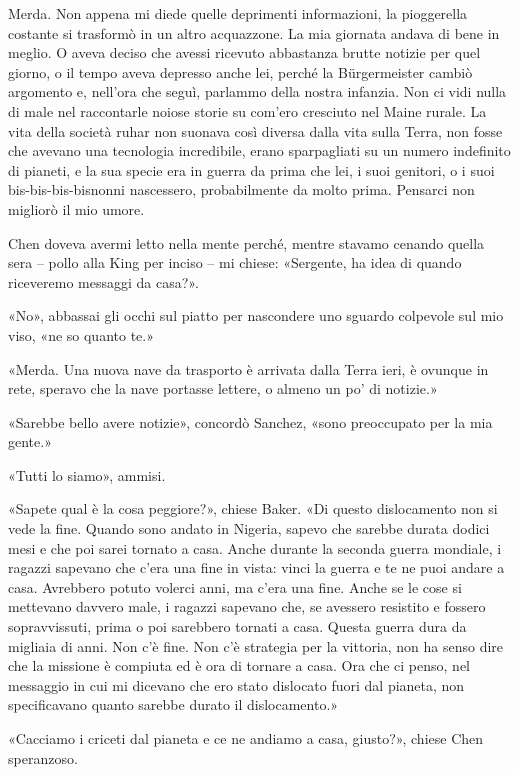 Merda. Non appena mi diede quelle deprimenti informazioni, la
pioggerella costante si trasformò in un altro acquazzone. La mia
giornata andava di bene in meglio. O aveva deciso che avessi ricevuto
abbastanza brutte notizie per quel giorno, o il tempo aveva depresso
anche lei, perché la Bürgermeister cambiò argomento e, nell'ora che
seguì, parlammo della nostra infanzia. Non ci vidi nulla di male nel
raccontarle noiose storie su com'ero cresciuto nel Maine rurale. La vita
della società ruhar non suonava così diversa dalla vita sulla Terra, non
fosse che avevano una tecnologia incredibile, erano sparpagliati su un
numero indefinito di pianeti, e la sua specie era in guerra da prima che
lei, i suoi genitori, o i suoi bis-bis-bis-bisnonni nascessero,
probabilmente da molto prima. Pensarci non migliorò il mio umore.

\hfill\break

Chen doveva avermi letto nella mente perché, mentre stavamo cenando
quella sera -- pollo alla King per inciso -- mi chiese: «Sergente, ha
idea di quando riceveremo messaggi da casa?».

«No», abbassai gli occhi sul piatto per nascondere uno sguardo colpevole
sul mio viso, «ne so quanto te.»

«Merda. Una nuova nave da trasporto è arrivata dalla Terra ieri, è
ovunque in rete, speravo che la nave portasse lettere, o almeno un po'
di notizie.»

«Sarebbe bello avere notizie», concordò Sanchez, «sono preoccupato per
la mia gente.»

«Tutti lo siamo», ammisi.

«Sapete qual è la cosa peggiore?», chiese Baker. «Di questo dislocamento
non si vede la fine. Quando sono andato in Nigeria, sapevo che sarebbe
durata dodici mesi e che poi sarei tornato a casa. Anche durante la
seconda guerra mondiale, i ragazzi sapevano che c'era una fine in vista:
vinci la guerra e te ne puoi andare a casa. Avrebbero potuto volerci
anni, ma c'era una fine. Anche se le cose si mettevano davvero male, i
ragazzi sapevano che, se avessero resistito e fossero sopravvissuti,
prima o poi sarebbero tornati a casa. Questa guerra dura da migliaia di
anni. Non c'è fine. Non c'è strategia per la vittoria, non ha senso dire
che la missione è compiuta ed è ora di tornare a casa. Ora che ci penso,
nel messaggio in cui mi dicevano che ero stato dislocato fuori dal
pianeta, non specificavano quanto sarebbe durato il dislocamento.»

«Cacciamo i criceti dal pianeta e ce ne andiamo a casa, giusto?», chiese
Chen speranzoso.

